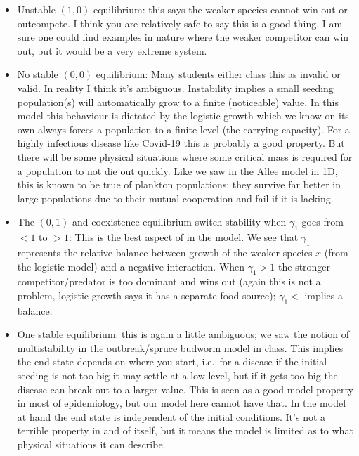 \documentclass[a4paper,12pt]{article}
\begin{document}
\begin{enumerate}
{    \begin{itemize}
    	\item Unstable $(1,0)$ equilibrium: this says the weaker species cannot win out or outcompete. I think you are relatively safe to say this is a good thing. I am sure one could find examples in nature where the weaker competitor can win out, but it would be a very extreme system. 
		\item No stable $(0,0)$ equilibrium: Many students either class this as invalid or valid. In reality I think it's ambiguous. Instability implies a small seeding population(s) will automatically grow to a finite (noticeable) value. In this model this behaviour is dictated by the logistic growth which we know on its own always forces a population to a finite level (the carrying capacity). For a highly infectious disease like Covid-19 this is probably a good property. But there will be some physical situations where some critical mass is required for a population to not die out quickly. Like we saw in the Allee model in 1D, this is known to be true of plankton populations; they survive far better in large populations due to their mutual cooperation and fail if it is lacking.
	\item The $(0,1)$ and coexistence equilibrium switch stability when $\gamma_1$ goes from $<1$ to $>1$: This is the best aspect of in the model. We see that $\gamma_1$ represents the relative balance between growth of the weaker species $x$ (from the logistic model) and a negative interaction. When $\gamma_1>1$ the stronger competitor/predator is too dominant and wins out (again this is not a problem, logistic growth says it has a separate food source); $\gamma_1<$ implies a balance. 
	\item One stable equilibrium: this is again a little ambiguous; we saw the notion of multistability in the outbreak/spruce budworm model in class. This implies the end state depends on where you start, i.e.\ for a disease if the initial seeding is not too big it may settle at a low level, but if it gets too big the disease can break out to a larger value. This is seen as a good model property in most of epidemiology, but our model here cannot have that. In the model at hand the end state is independent of the initial conditions. It's not a terrible property in and of itself, but it means the model is limited as to what physical situations it can describe.
    \end{itemize}
  
  
}
\end{enumerate}
\end{document}
